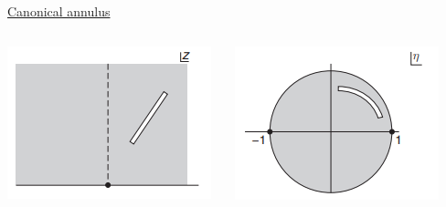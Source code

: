 \documentclass[11pt,aspectratio=169]{beamer}
\begin{document}
\begin{frame}{\underline{Canonical annulus}}
	\begin{columns}
		\begin{column}{0.25\textwidth}
			\includegraphics[width=\columnwidth]{elements/exponential map.PNG}
		\end{column}
		\begin{column}{0.25\textwidth}
			\includegraphics[width=\columnwidth]{elements/LFT.PNG}
		\end{column}
		\begin{column}{0.25\textwidth}

\end{column}
\end{columns}
\end{frame}
\end{document}
